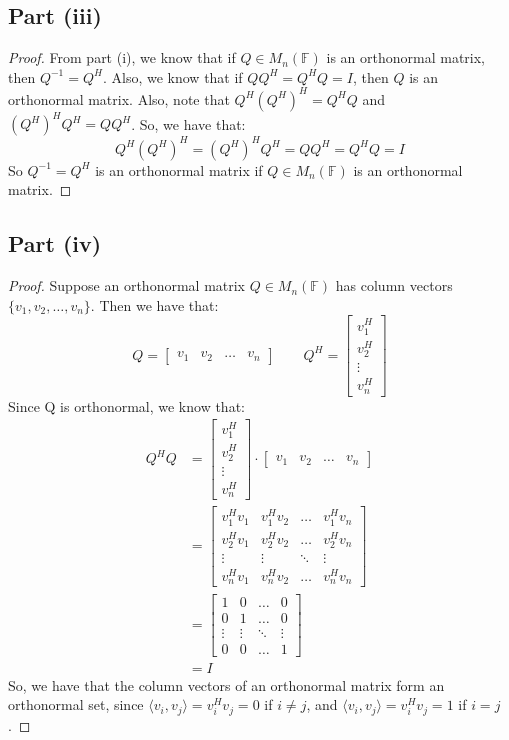 \documentclass{article}
\begin{document}
\subsection*{Part (iii)}

\begin{proof}
From part (i), we know that if $Q \in M_n(\mathbb{F})$ is an orthonormal matrix, then $Q^{-1} = Q^H$. Also, we know that if $QQ^{H} = Q^{H}Q = I$, then $Q$ is an orthonormal matrix. Also, note that $Q^{H}(Q^{H})^{H} = Q^{H}Q$ and $(Q^{H})^{H}Q^{H} = QQ^{H}$. So, we have that:
$$Q^{H}(Q^{H})^{H} = (Q^{H})^{H}Q^{H} = QQ^{H} = Q^{H}Q  = I$$
So $Q^{-1} = Q^{H}$ is an orthonormal matrix if $Q \in M_n(\mathbb{F})$ is an orthonormal matrix.
\end{proof}

\subsection*{Part (iv)}

\begin{proof}
Suppose an orthonormal matrix $Q \in M_n(\mathbb{F})$ has column vectors $\{v_1, v_2, \dots, v_n\}$. Then we have that:
$$Q = \begin{bmatrix} v_1 & v_2 & \dots & v_n \end{bmatrix} \qquad Q^H = \begin{bmatrix} v_1^H \\ v_2^H \\ \vdots \\ v_n^H \end{bmatrix}$$
Since Q is orthonormal, we know that:
\begin{align*}
Q^{H}Q &= \begin{bmatrix} v_1^H \\ v_2^H \\ \vdots \\ v_n^H \end{bmatrix} \cdot   \begin{bmatrix} v_1 & v_2 & \dots & v_n \end{bmatrix} \\
&=  \begin{bmatrix} v_1^{H}v_1 & v_1^{H}v_2 & \dots & v_1^{H}v_n \\
v_2^{H}v_1 & v_2^{H}v_2 & \dots & v_2^{H}v_n \\
\vdots & \vdots & \ddots & \vdots \\
v_n^{H}v_1 & v_n^{H}v_2 & \dots & v_n^{H}v_n \end{bmatrix} \\
&= \begin{bmatrix} 1 & 0 & \dots & 0 \\
0 & 1 & \dots & 0 \\
\vdots & \vdots & \ddots & \vdots \\
0 & 0 & \dots & 1 \end{bmatrix} \\
&= I
\end{align*}
So, we have that the column vectors of an orthonormal matrix form an orthonormal set, since $\langle v_i, v_j \rangle = v_i^{H}v_j = 0$ if $i \ne j$, and $\langle v_i, v_j \rangle = v_i^{H}v_j = 1$ if $i = j$.
\end{proof}
\end{document}
